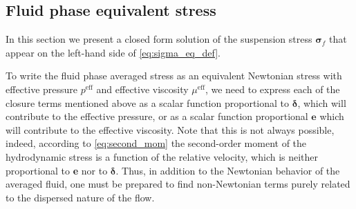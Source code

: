 \subsection{Fluid phase equivalent stress}

In this section we present a closed form solution of the suspension stress $\bm{\sigma}_f$ that appear on the left-hand side of 
\ref{eq:sigma_eq_def}. 

To write the fluid phase averaged stress as an equivalent Newtonian stress with effective pressure $p^\text{eff}$ and effective viscosity $\mu^\text{eff}$, we need to express each of the closure terms mentioned above as a scalar function proportional to $\bm\delta$, which will contribute to the effective pressure, or as a scalar function proportional $\textbf{e}$ which will contribute to the effective viscosity. 
Note that this is not always possible, indeed, according to \ref{eq:second_mom} the second-order moment of the hydrodynamic stress is a function of the relative velocity, which is neither proportional to \textbf{e} nor to $\bm\delta$. 
Thus, in addition to the Newtonian behavior of the averaged fluid, one must be prepared to find non-Newtonian terms purely related to the dispersed nature of the flow. 

